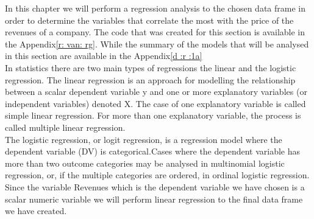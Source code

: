 \documentclass{book}
\begin{document}
In this chapter we will perform a regression analysis to the chosen data frame in order to determine the variables that correlate the most with the price of the revenues of a company. The code that was created for this section is available in the Appendix\ref{r: van: rg}. While the summary of the models that will be analysed in this section are available in the Appendix\ref{d :r :1a}\\
In statistics there are two main types of regressions the linear and the logistic regression. The linear regression is an approach for modelling the relationship between a scalar dependent variable y and one or more explanatory variables (or independent variables) denoted X. The case of one explanatory variable is called simple linear regression. For more than one explanatory variable, the process is called multiple linear regression.\\
The logistic regression, or logit regression, is a regression model where the dependent variable (DV) is categorical.Cases where the dependent variable has more than two outcome categories may be analysed in multinomial logistic regression, or, if the multiple categories are ordered, in ordinal logistic regression.\\
Since the variable Revenues which is the dependent variable we have chosen is a scalar numeric variable we will perform linear regression to the final data frame we have created.

 

\pagebreak  
\end{document}
